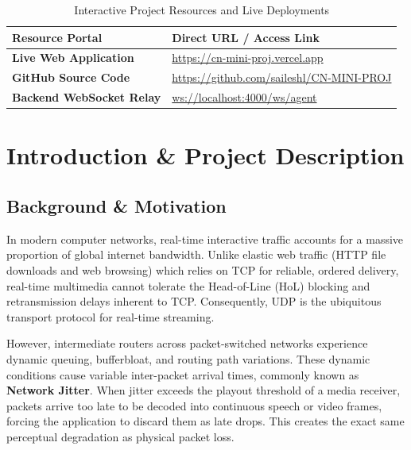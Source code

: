 \documentclass[12pt, a4paper]{report}
\begin{document}
\begin{table}[H]
\centering
\begin{tabularx}{\textwidth}{|l|L|}
\hline
\textbf{Resource Portal} & \textbf{Direct URL / Access Link} \\
\hline
\textbf{Live Web Application} & \url{https://cn-mini-proj.vercel.app} \\
\hline
\textbf{GitHub Source Code} & \url{https://github.com/saileshl/CN-MINI-PROJ} \\
\hline
\textbf{Backend WebSocket Relay} & \url{ws://localhost:4000/ws/agent} \\
\hline
\end{tabularx}
\caption{Interactive Project Resources and Live Deployments}
\end{table}

\newpage
\chapter{Introduction \& Project Description}

\section{Background \& Motivation}
In modern computer networks, real-time interactive traffic accounts for a massive proportion of global internet bandwidth. Unlike elastic web traffic (HTTP file downloads and web browsing) which relies on TCP for reliable, ordered delivery, real-time multimedia cannot tolerate the Head-of-Line (HoL) blocking and retransmission delays inherent to TCP. Consequently, UDP is the ubiquitous transport protocol for real-time streaming.

However, intermediate routers across packet-switched networks experience dynamic queuing, bufferbloat, and routing path variations. These dynamic conditions cause variable inter-packet arrival times, commonly known as \textbf{Network Jitter}. When jitter exceeds the playout threshold of a media receiver, packets arrive too late to be decoded into continuous speech or video frames, forcing the application to discard them as late drops. This creates the exact same perceptual degradation as physical packet loss.
\end{document}
